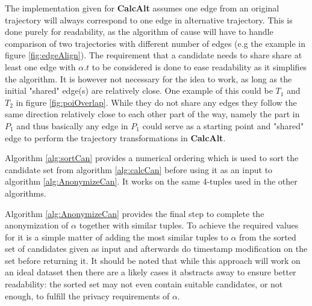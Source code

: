 The implementation given for {\bf CalcAlt} assumes one edge from an original trajectory will always correspond to one edge in alternative trajectory. This is done purely for readability, as the algorithm of cause will have to handle comparison of two trajectories with different number of edges (e.g the example in figure \ref{fig:edgeAlign}). The requirement that a candidate needs to share share at least one edge with $\alpha.{t}$ to be considered is done to ease readability as it simplifies the algorithm. It is however not necessary for the idea to work, as long as the initial "shared" edge(s) are relatively close. One example of this could be $T_1$ and $T_2$ in figure \ref{fig:poiOverlap}. While they do not share any edges they follow the same direction relatively close to each other part of the way, namely the part in \poi $P_1$ and thus basically any edge in $P_1$ could serve as a starting point and "shared" edge to perform the trajectory transformations in {\bf CalcAlt}.
% 
% 
% 





Algorithm \ref{alg:sortCan} provides a numerical ordering which is used to sort the candidate set from algorithm \ref{alg:calcCan} before using it as an input to algorithm \ref{alg:AnonymizeCan}. It works on the same 4-tuples used in the other algorithms.





Algorithm \ref{alg:AnonymizeCan} provides the final step to complete the anonymization of $\alpha$ together with similar tuples. To achieve the required values for \tanon it is a simple matter of adding the most similar tuples to $\alpha$ from the sorted set of candidates given as input and afterwards do timestamp modification on the set before returning it. 
It should be noted that while this approach will work on an ideal dataset then there are a likely cases it abstracts away to ensure better readability: the sorted set may not even contain suitable candidates, or not enough, to fulfill the privacy requirements of $\alpha$.




